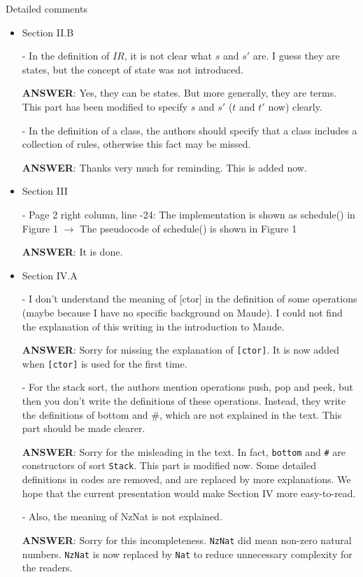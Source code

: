 \documentclass[10pt,journal]{IEEEtran}
\newcommand{\ANSWER}{{\bf ANSWER}}
\begin{document}
Detailed comments
\begin{itemize}
\item
Section II.B  

- In the definition of $IR$, it is not clear what $s$ and $s'$ are. I
guess they are states, but the concept of state was not introduced.

\ANSWER: Yes, they can be states. But more generally, they are
terms. This part has been modified to specify $s$ and $s'$ ($t$ and
$t'$ now) clearly.

- In the definition of a class, the authors should specify that a
class includes a collection of rules, otherwise this fact may be
missed.

\ANSWER: Thanks very much for reminding. This is added now.

\item
Section III 

- Page 2 right column, line -24: The implementation is shown as
schedule() in Figure 1 $\rightarrow$ The pseudocode of schedule() is
shown in Figure 1

\ANSWER: It is done.

\item
Section IV.A 

- I don't understand the meaning of [ctor] in the definition of some
operations (maybe because I have no specific background on Maude). I
could not find the explanation of this writing in the introduction to
Maude.

\ANSWER: Sorry for missing the explanation of \verb|[ctor]|. It is now
added when \verb|[ctor]| is used for the first time.

- For the stack sort, the authors mention operations push, pop and
peek, but then you don't write the definitions of these
operations. Instead, they write the definitions of bottom and \#,
which are not explained in the text. This part should be made clearer.

\ANSWER: Sorry for the misleading in the text. In fact, \verb|bottom|
and \verb|#| are constructors of sort \verb|Stack|. This part is
modified now. Some detailed definitions in codes are removed, and are
replaced by more explanations. We hope that the current presentation
would make Section IV more easy-to-read.

- Also, the meaning of NzNat is not explained.

\ANSWER: Sorry for this incompleteness. \verb|NzNat| did mean non-zero
natural numbers. \verb|NzNat| is now replaced by \verb|Nat| to reduce
unnecessary complexity for the readers.


\end{itemize}
\end{document}
